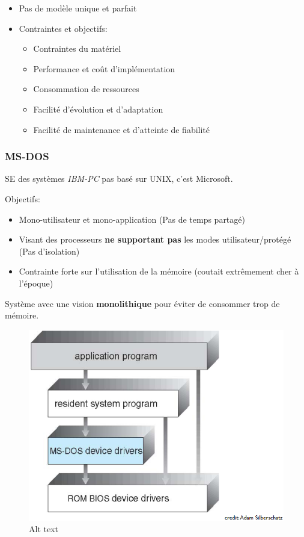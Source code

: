 \begin{itemize}
\tightlist
\item
  Pas de modèle unique et parfait
\item
  Contraintes et objectifs:

  \begin{itemize}
  \tightlist
  \item
    Contraintes du matériel
  \item
    Performance et coût d'implémentation
  \item
    Consommation de ressources
  \item
    Facilité d'évolution et d'adaptation
  \item
    Facilité de maintenance et d'atteinte de fiabilité
  \end{itemize}
\end{itemize}

\subsubsection{MS-DOS}\label{ms-dos}

SE des systèmes \emph{IBM-PC} pas basé sur UNIX, c'est Microsoft.

Objectifs:

\begin{itemize}
\tightlist
\item
  Mono-utilisateur et mono-application (Pas de temps partagé)
\item
  Visant des processeurs \textbf{ne supportant pas} les modes
  utilisateur/protégé (Pas d'isolation)
\item
  Contrainte forte sur l'utilisation de la mémoire (coutait extrêmement
  cher à l'époque)
\end{itemize}

Système avec une vision \textbf{monolithique} pour éviter de consommer
trop de mémoire.

\begin{figure}
\centering
\includegraphics{image-16.png}
\caption{Alt text}
\end{figure}

